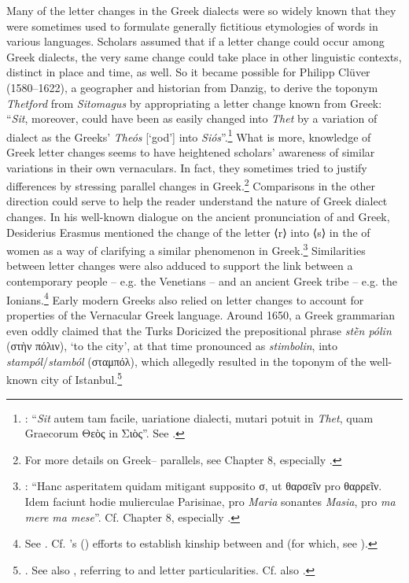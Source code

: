 Many of the letter changes in the Greek dialects were so widely known that they were sometimes used to formulate generally fictitious etymologies of words in various languages. Scholars assumed that if a letter change could occur among Greek dialects, the very same change could take place in other linguistic contexts, distinct in place and time, as well. So it became possible for Philipp Clüver (1580–1622), a geographer and historian from Danzig, to derive the  toponym \textit{Thetford} from  \textit{Sitomagus} by appropriating a letter change known from Greek: “\textit{Sit}, moreover, could have been as easily changed into \textit{Thet} by a variation of dialect as the Greeks’ \textit{Theós} [`god'] into \textit{Siós}”.\footnote{{\citet[64]{Cluver1616}: “}{\textit{Sit}} {autem tam facile, uariatione dialecti, mutari potuit in} {\textit{Thet}}{, quam Graecorum Θεὸς in Σιὸς”. See \citet[114--115]{Metcalf2013}.}} What is more, knowledge of Greek letter changes seems to have heightened scholars’ awareness of similar variations in their own vernaculars. In fact, they sometimes tried to justify  differences by stressing parallel changes in Greek.\footnote{{For more details on Greek– parallels, see Chapter 8, especially .}} Comparisons in the other direction could serve to help the reader understand the nature of Greek dialect changes. In his well-known dialogue on the ancient pronunciation of  and Greek, Desiderius Erasmus mentioned the change of the letter ⟨r⟩ into ⟨s⟩ in the  of  women as a way of clarifying a similar phenomenon in Greek.\footnote{{\citet[52]{Erasmus1528}: “Hanc asperitatem quidam mitigant supposito σ, ut θαρσεῖν pro θαρρεῖν. Idem faciunt hodie mulierculae Parisinae, pro} {\textit{Maria}} {sonantes} {\textit{Masia}}{, pro} {\textit{ma mere ma mese}}{”. Cf. Chapter 8, especially .}} Similarities between letter changes were also adduced to support the link between a contemporary people – e.g. the Venetians – and an ancient Greek tribe – e.g. the Ionians.\footnote{{See . Cf. \citeauthor{Reitz1730}'s (\citeyear[e.g., 122, 125, 126–127]{Reitz1730}) efforts to establish kinship between  and  (for which, see \citealt{VanHal2016}).}} Early modern Greeks also relied on  letter changes to account for properties of the Vernacular Greek language. Around 1650, a Greek grammarian even oddly claimed that the Turks Doricized the prepositional phrase \textit{stḕn pólin} (στὴν πόλιν), ‘to the city’, at that time pronounced as \textit{stimbolin}, into \textit{stampól}/\textit{stamból} (σταμπόλ), which allegedly resulted in the toponym of the well-known city of Istanbul.\footnote{{\citet[14]{Nikiforos1908}. See also \citet[35]{Nikiforos1908}, referring to  and  letter particularities. Cf.} also \citet[\textsc{a.4}\textsc{\textsuperscript{r}}]{Rodigast1685}.}


